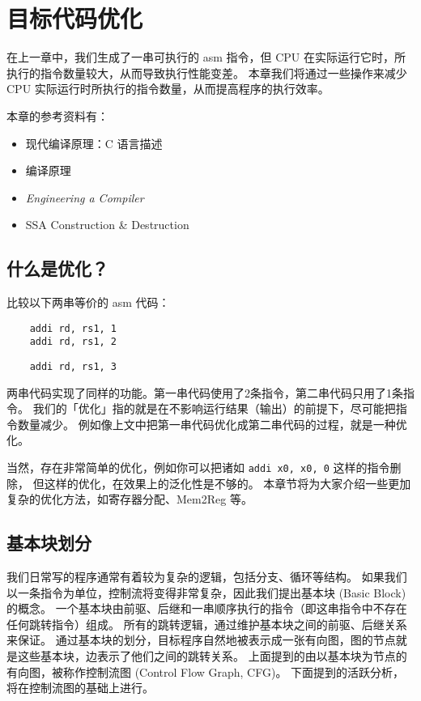 \chapter{目标代码优化}

\label{chap:optimize}
在上一章中，我们生成了一串可执行的 asm 指令，但 CPU 在实际运行它时，所执行的指令数量较大，从而导致执行性能变差。
本章我们将通过一些操作来减少 CPU 实际运行时所执行的指令数量，从而提高程序的执行效率。

\begin{remark}
本章的参考资料有：
\begin{itemize}
    \item 现代编译原理：C 语言描述\cite{TigerBook}
    \item 编译原理\cite{DragonBook}
    \item \textit{Engineering a Compiler}\cite{EngineeringACompiler}
    \item SSA Construction \& Destruction\cite{SSAConstructionAndDestruction}
\end{itemize}
\end{remark}

\section{什么是优化？}

比较以下两串等价的 asm 代码：
\begin{lstlisting}
    addi rd, rs1, 1
    addi rd, rs1, 2
\end{lstlisting}
\begin{lstlisting}  
    addi rd, rs1, 3
\end{lstlisting}

两串代码实现了同样的功能。第一串代码使用了2条指令，第二串代码只用了1条指令。
我们的「优化」指的就是在不影响运行结果（输出）的前提下，尽可能把指令数量减少。
例如像上文中把第一串代码优化成第二串代码的过程，就是一种优化。

当然，存在非常简单的优化，例如你可以把诸如 \texttt{addi x0, x0, 0} 这样的指令删除，
但这样的优化，在效果上的泛化性是不够的。
本章节将为大家介绍一些更加复杂的优化方法，如寄存器分配、Mem2Reg 等。

\section{基本块划分}

我们日常写的程序通常有着较为复杂的逻辑，包括分支、循环等结构。
如果我们以一条指令为单位，控制流将变得非常复杂，因此我们提出基本块 (Basic Block) 的概念。
一个基本块由前驱、后继和一串顺序执行的指令（即这串指令中不存在任何跳转指令）组成。
所有的跳转逻辑，通过维护基本块之间的前驱、后继关系来保证。
通过基本块的划分，目标程序自然地被表示成一张有向图，图的节点就是这些基本块，边表示了他们之间的跳转关系。
上面提到的由以基本块为节点的有向图，被称作控制流图 (Control Flow Graph, CFG)。
下面提到的活跃分析，将在控制流图的基础上进行。

